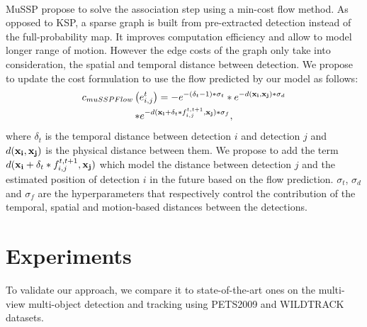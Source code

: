 \documentclass[10pt,twocolumn,letterpaper]{article}
\begin{document}
\paragraph*{}
MuSSP\cite{Wang19f} propose to solve the association step using a min-cost flow method.
As opposed to KSP, a sparse graph is built from pre-extracted detection instead of the full-probability map. It improves computation efficiency 
and allow to model longer range of motion. However the edge costs of the graph only take into consideration, the spatial and temporal distance between detection.
We propose to update the cost formulation to use the flow predicted by our model as follows:
\begin{multline}
    c_{muSSPFlow}\left(e_{i, j}^{t}\right)=-e^{-(\delta_t-1)*\sigma_t}*e^{-d(\mathbf{x_i},\mathbf{x_j})*\sigma_d}\\
    *e^{-d(\mathbf{x_i}+\delta_t*f_{i, j}^{t, t+1},\mathbf{x_j})*\sigma_f},
    \label{eq:edge_cost_mussp}
\end{multline}
where $\delta_t$ is the temporal distance between detection $i$ and detection $j$ and $d(\mathbf{x_i},\mathbf{x_j})$ is the physical distance between them.
We propose to add the term $d(\mathbf{x_i}+\delta_t*f_{i, j}^{t, t+1},\mathbf{x_j})$ which model the distance between detection $j$ and the estimated position of detection 
$i$ in the future based on the flow prediction. $\sigma_t$, $\sigma_d$ and $\sigma_f$ are the hyperparameters that respectively control the contribution of the temporal, 
spatial and motion-based distances between the detections.
  
\section{Experiments}\label{sec:expe}
 

To validate our approach, we compare it to state-of-the-art ones on the multi-view multi-object detection and tracking using PETS2009 and WILDTRACK datasets. 
\end{document}
